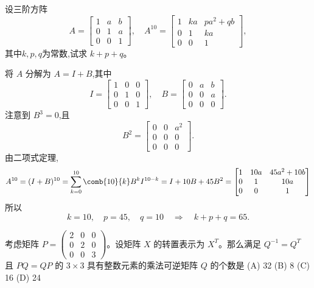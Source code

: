 \begin{questions}
    \question 设三阶方阵 
    \[
    A = \begin{bmatrix}1 & a & b \\ 0 & 1 & a \\ 0 & 0 & 1\end{bmatrix},\quad 
    A^{10} = \begin{bmatrix}1 & ka & pa^2 + qb \\ 0 & 1 & ka \\ 0 & 0 & 1\end{bmatrix},
    \]
    其中$k,p,q$为常数,试求 $k+p+q$。
    \begin{solution}
        将 $A$ 分解为 $A = I + B$,其中
        \[
        I = \begin{bmatrix}1 & 0 & 0 \\ 0 & 1 & 0 \\ 0 & 0 & 1\end{bmatrix},\quad
        B = \begin{bmatrix}0 & a & b \\ 0 & 0 & a \\ 0 & 0 & 0\end{bmatrix}.
        \]
        注意到 $B^3 = 0$,且
        \[
        B^2 = \begin{bmatrix}0 & 0 & a^2 \\ 0 & 0 & 0 \\ 0 & 0 & 0\end{bmatrix}.
        \]
        由二项式定理,
        \[
        A^{10} = (I + B)^{10} = \sum_{k=0}^{10} \comb{10}{k} B^k I^{10-k} = I + 10B + 45 B^2=\begin{bmatrix}1 & 10a & 45a^2+10b \\ 0 & 1 & 10a \\ 0 & 0 & 1\end{bmatrix}
        \]
        所以
        \[
        k = 10,\quad p = 45,\quad q = 10 \quad \Rightarrow \quad k+p+q = 65.
        \]
    \end{solution}

    \question
考虑矩阵 $P = \begin{pmatrix} 2 & 0 & 0 \\ 0 & 2 & 0 \\ 0 & 0 & 3 \end{pmatrix}$。设矩阵 $X$ 的转置表示为 $X^T$。那么满足 $Q^{-1} = Q^T$ 且 $PQ = QP$ 的 $3 \times 3$ 具有整数元素的乘法可逆矩阵 $Q$ 的个数是
(A) 32
(B) 8
(C) 16
(D) 24


\end{questions}
